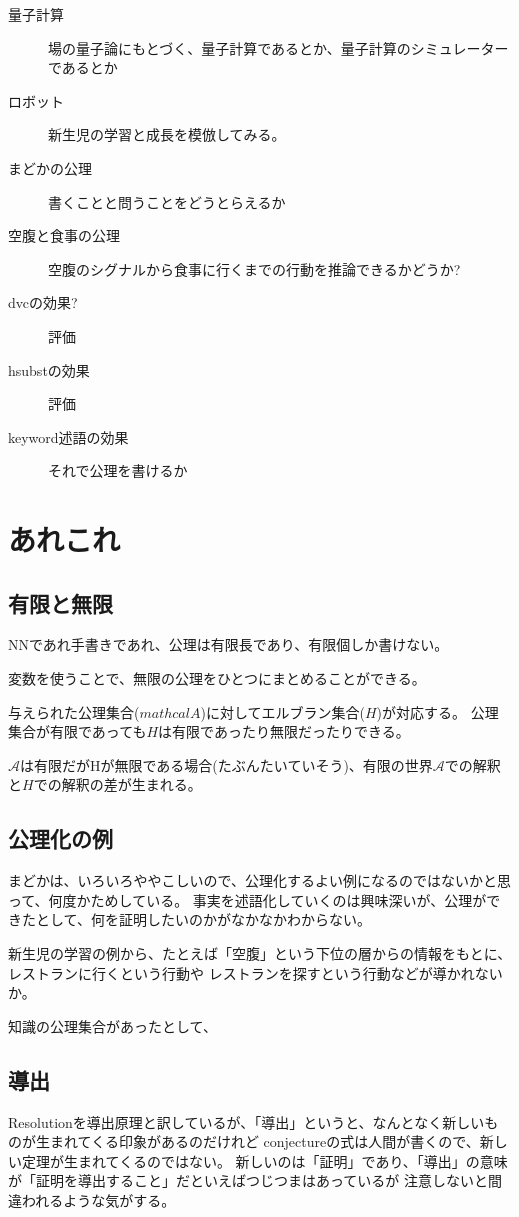 \documentclass[10pt, oneside]{jarticle}   	%
\begin{document}
\begin{description}
\item[量子計算] 場の量子論にもとづく、量子計算であるとか、量子計算のシミュレーターであるとか

\item[ロボット] 新生児の学習と成長を模倣してみる。

\item[ まどかの公理] 書くことと問うことをどうとらえるか 
\item[ 空腹と食事の公理] 空腹のシグナルから食事に行くまでの行動を推論できるかどうか?

\item[ dvcの効果?] 評価
\item[ hsubstの効果] 評価
\item[ keyword述語の効果] それで公理を書けるか
\end{description}

\section{あれこれ}
\subsection{有限と無限}
NNであれ手書きであれ、公理は有限長であり、有限個しか書けない。

変数を使うことで、無限の公理をひとつにまとめることができる。

与えられた公理集合($mathcal{A}$)に対してエルブラン集合($H$)が対応する。
公理集合が有限であっても$H$は有限であったり無限だったりできる。

$\mathcal{A}$は有限だがHが無限である場合(たぶんたいていそう)、有限の世界$\mathcal{A}$での解釈と$H$での解釈の差が生まれる。

\subsection{公理化の例}
まどかは、いろいろややこしいので、公理化するよい例になるのではないかと思って、何度かためしている。
事実を述語化していくのは興味深いが、公理ができたとして、何を証明したいのかがなかなかわからない。

新生児の学習の例から、たとえば「空腹」という下位の層からの情報をもとに、レストランに行くという行動や
レストランを探すという行動などが導かれないか。

知識の公理集合があったとして、

\subsection{導出}
Resolutionを導出原理と訳しているが、「導出」というと、なんとなく新しいものが生まれてくる印象があるのだけれど
conjectureの式は人間が書くので、新しい定理が生まれてくるのではない。
新しいのは「証明」であり、「導出」の意味が「証明を導出すること」だといえばつじつまはあっているが
注意しないと間違われるような気がする。
\end{document}
